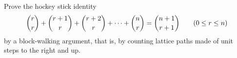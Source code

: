 Prove the hockey stick identity
\[\dbinom rr+\dbinom{r+1}{r}+\dbinom{r+2}{r}+\cdots+\dbinom nr=\dbinom{n+1}{r+1}\qquad(0\le r\le n)\]
by a block-walking argument, that is, by counting lattice paths made of unit steps to the right and up.
